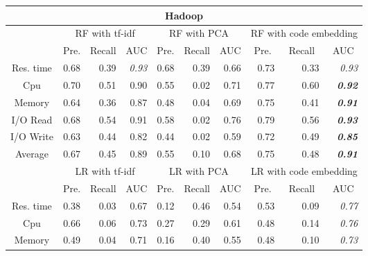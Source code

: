 \begin{table}
\begin{tabular}{|c|r|r|r|r|r|r|r|r|r|}
\hline
\multicolumn{10}{|c|}{Hadoop}    \\ \hline
\multirow{2}{*}{} & \multicolumn{3}{c|}{RF with tf-idf}        & \multicolumn{3}{c|}{RF with PCA}           & \multicolumn{3}{c|}{RF with code embedding}\\ \cline{2-10} 
                  & \multicolumn{1}{c|}{Pre.} & \multicolumn{1}{c|}{Recall} & \multicolumn{1}{c|}{AUC} & \multicolumn{1}{c|}{Pre.} & \multicolumn{1}{c|}{Recall} & \multicolumn{1}{c|}{AUC} & \multicolumn{1}{c|}{Pre.} & \multicolumn{1}{c|}{Recall} & \multicolumn{1}{c|}{AUC} \\ \hline
Res. time         & 0.68  & 0.39    & \textit{0.93}            & 0.68  & 0.39    & 0.66 & 0.73  & 0.33    & \textit{0.93}            \\ \hline
Cpu               & 0.70  & 0.51    & 0.90 & 0.55  & 0.02    & 0.71 & 0.77  & 0.60    & \textit{\textbf{0.92}}   \\ \hline
Memory            & 0.64  & 0.36    & 0.87 & 0.48  & 0.04    & 0.69 & 0.75  & 0.41    & \textit{\textbf{0.91}}   \\ \hline
I/O Read          & 0.68  & 0.54    & 0.91 & 0.58  & 0.02    & 0.76 & 0.79  & 0.56    & \textit{\textbf{0.93}}   \\ \hline
I/O Write         & 0.63  & 0.44    & 0.82 & 0.44  & 0.02    & 0.59 & 0.72  & 0.49    & \textit{\textbf{0.85}}   \\ \hline
Average           & 0.67  & 0.45    & 0.89 & 0.55  & 0.10    & 0.68 & 0.75  & 0.48    & \textit{\textbf{0.91}}   \\ \hline
\multirow{2}{*}{} & \multicolumn{3}{c|}{LR with tf-idf}        & \multicolumn{3}{c|}{LR with PCA}           & \multicolumn{3}{c|}{LR with code embedding}\\ \cline{2-10} 
                  & \multicolumn{1}{c|}{Pre.} & \multicolumn{1}{c|}{Recall} & \multicolumn{1}{c|}{AUC} & \multicolumn{1}{c|}{Pre.} & \multicolumn{1}{c|}{Recall} & \multicolumn{1}{c|}{AUC} & \multicolumn{1}{c|}{Pre.} & \multicolumn{1}{c|}{Recall} & \multicolumn{1}{c|}{AUC} \\ \hline
Res. time         & 0.38  & 0.03    & 0.67 & 0.12  & 0.46    & 0.54 & 0.53  & 0.09    & \textit{0.77}            \\ \hline
Cpu               & 0.66  & 0.06    & 0.73 & 0.27  & 0.29    & 0.61 & 0.48  & 0.14    & \textit{0.76}            \\ \hline
Memory            & 0.49  & 0.04    & 0.71 & 0.16  & 0.40    & 0.55 & 0.48  & 0.10    & \textit{0.73}            \\ \hline

\end{tabular}
\end{table}
